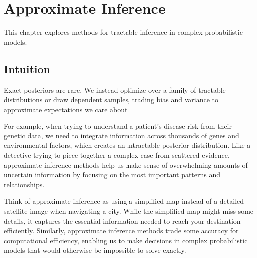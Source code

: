 
\chapter{Approximate Inference}
\label{chap:approximate-inference}

This chapter explores methods for tractable inference in complex probabilistic models.


\begin{learningobjectives}
\end{learningobjectives}



\section*{Intuition}

Exact posteriors are rare. We instead optimize over a family of tractable distributions or draw dependent samples, trading bias and variance to approximate expectations we care about.

For example, when trying to understand a patient's disease risk from their genetic data, we need to integrate information across thousands of genes and environmental factors, which creates an intractable posterior distribution. Like a detective trying to piece together a complex case from scattered evidence, approximate inference methods help us make sense of overwhelming amounts of uncertain information by focusing on the most important patterns and relationships.

Think of approximate inference as using a simplified map instead of a detailed satellite image when navigating a city. While the simplified map might miss some details, it captures the essential information needed to reach your destination efficiently. Similarly, approximate inference methods trade some accuracy for computational efficiency, enabling us to make decisions in complex probabilistic models that would otherwise be impossible to solve exactly.











